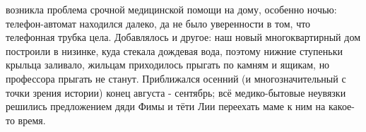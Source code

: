 \label{186-1}
 возникла проблема срочной медицинской помощи на дому, особенно ночью: телефон-автомат находился далеко, да не было уверенности в том, что телефонная трубка цела. Добавлялось и другое: наш новый многоквартирный дом построили в низинке, куда стекала дождевая вода, поэтому нижние ступеньки крыльца заливало, жильцам приходилось прыгать по камням и ящикам, но профессора прыгать не станут. Приближался осенний (и многозначительный с точки зрения истории) конец августа - сентябрь; всё медико-бытовые неувязки решились предложением дяди Фимы и тёти Лии переехать маме к ним на какое-то время.